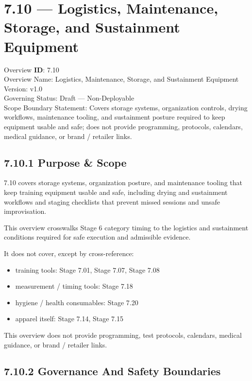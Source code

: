 \documentclass[10pt]{article}
\begin{document}
\section*{7.10 — Logistics, Maintenance, Storage, and Sustainment Equipment}
{}

Overview \textbf{ID}: 7.10\\
Overview Name: Logistics, Maintenance, Storage, and Sustainment Equipment\\
Version: v1.0\\
Governing Status: Draft — Non-Deployable\\
Scope Boundary Statement: Covers storage systems, organization controls, drying workflows, maintenance tooling, and sustainment posture required to keep equipment usable and safe; does not provide programming, protocols, calendars, medical guidance, or brand / retailer links.

\subsection*{7.10.1 Purpose \& Scope}
{}

7.10 covers storage systems, organization posture, and maintenance tooling that keep training equipment usable and safe, including drying and sustainment workflows and staging checklists that prevent missed sessions and unsafe improvisation.

This overview crosswalks Stage 6 category timing to the logistics and sustainment conditions required for safe execution and admissible evidence.

It does not cover, except by cross-reference:

\begin{itemize}
\item training tools: Stage 7.01, Stage 7.07, Stage 7.08
\item measurement / timing tools: Stage 7.18
\item hygiene / health consumables: Stage 7.20
\item apparel itself: Stage 7.14, Stage 7.15
\end{itemize}

This overview does not provide programming, test protocols, calendars, medical guidance, or brand / retailer links.

\subsection*{7.10.2 Governance And Safety Boundaries}
{}
\end{document}

